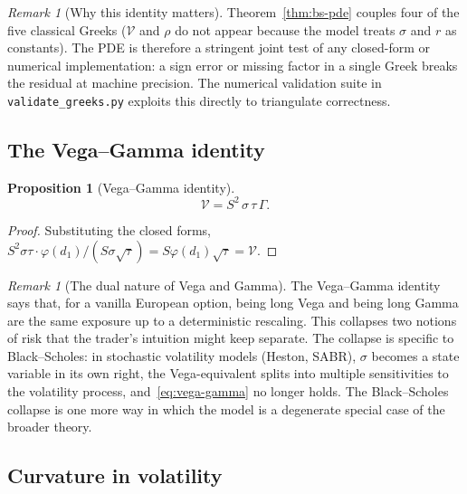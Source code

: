 \documentclass[11pt,a4paper]{article}
\theoremstyle{plain}
\newtheorem{proposition}[theorem]{Proposition}
\theoremstyle{definition}
\theoremstyle{remark}
\newtheorem{remark}[theorem]{Remark}
\newcommand{\Vega}{\mathcal{V}}
\begin{document}
\begin{remark}[Why this identity matters]
Theorem~\ref{thm:bs-pde} couples four of the five classical Greeks
(\(\Vega\) and \(\rho\) do not appear because the model treats
\(\sigma\) and \(r\) as constants). The PDE is therefore a stringent
joint test of any closed-form or numerical implementation: a sign
error or missing factor in a single Greek breaks the residual at
machine precision. The numerical validation suite in
\texttt{validate\_greeks.py} exploits this directly to triangulate
correctness.
\end{remark}

\subsection{The Vega--Gamma identity}

\begin{proposition}[Vega--Gamma identity]
\label{prop:vega-gamma}
\begin{equation}
    \Vega = S^2\, \sigma\, \tau\, \Gamma.
    \label{eq:vega-gamma}
\end{equation}
\end{proposition}

\begin{proof}
Substituting the closed forms,
\(S^2 \sigma \tau \cdot \varphi(d_1) / (S \sigma \sqrt{\tau}) = S \varphi(d_1) \sqrt{\tau} = \Vega\).
\end{proof}

\begin{remark}[The dual nature of Vega and Gamma]
The Vega--Gamma identity says that, for a vanilla European option,
being long Vega and being long Gamma are the same exposure up to a
deterministic rescaling. This collapses two notions of risk that the
trader's intuition might keep separate. The collapse is specific to
Black--Scholes: in stochastic volatility models (Heston, SABR),
\(\sigma\) becomes a state variable in its own right, the
Vega-equivalent splits into multiple sensitivities to the volatility
process, and~\eqref{eq:vega-gamma} no longer holds. The Black--Scholes
collapse is one more way in which the model is a degenerate special
case of the broader theory.
\end{remark}

\subsection{Curvature in volatility}
\end{document}
